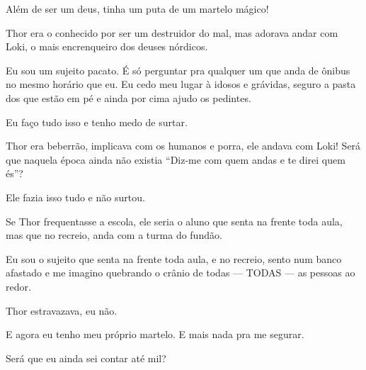Além de ser um deus, tinha um puta de um martelo mágico!

Thor era o conhecido por ser um destruidor do mal, mas adorava andar com Loki, o mais encrenqueiro dos deuses nórdicos.

Eu sou um sujeito pacato. É só perguntar pra qualquer um que anda de ônibus no mesmo horário que eu. Eu cedo meu lugar à idosos e grávidas, seguro a pasta dos que estão em pé e ainda por cima ajudo os pedintes.

Eu faço tudo isso e tenho medo de surtar.

Thor era beberrão, implicava com os humanos e porra, ele andava com Loki! Será que naquela época ainda não existia ``Diz-me com quem andas e te direi quem és''?

Ele fazia isso tudo e não surtou.

Se Thor frequentasse a escola, ele seria o aluno que senta na frente toda aula, mas que no recreio, anda com a turma do fundão.

Eu sou o sujeito que senta na frente toda aula, e no recreio, sento num banco afastado e me imagino quebrando o crânio de todas --- TODAS --- as pessoas ao redor.

Thor estravazava, eu não.

E agora eu tenho meu próprio martelo. E mais nada pra me segurar.

Será que eu ainda sei contar até mil?
